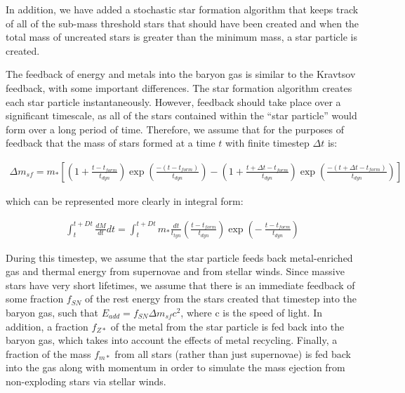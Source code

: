 In addition, we have added a stochastic star formation algorithm that keeps 
track of all of the sub-mass threshold stars that should have been created 
and when the total mass of uncreated stars is greater than the minimum mass, 
a star particle is created.

The feedback of energy and metals into the baryon gas is similar to
the Kravtsov feedback, with some important differences.  The star formation 
algorithm creates each star particle instantaneously.  However, feedback
should take place over a significant timescale, as all of the stars contained
within the ``star particle'' would form over a long period of time.  Therefore,
we assume that for the purposes of feedback that the mass of stars formed
at a time $t$ with finite timestep $\Delta t$ is:

\begin{eqnarray}  
\Delta m_{sf} =  m_{*} \left[ \left(1 + \frac{t-t_{form}}{t_{dyn}}  \right)
		   \exp{\left( \frac{-(t-t_{form})}{t_{dyn}} \right) }
	       - \left( 1 + \frac{t+ \Delta t-t_{form}}{t_{dyn}} \right) 
                    \exp{ \left( \frac{-(t+\Delta t-t_{form})}{t_{dyn}} \right)  }
                   \right]
\end{eqnarray}

which can be represented more clearly in integral form:

\begin{eqnarray}
\int_{t}^{t+Dt} \frac{dM}{dt} dt = \int_{t}^{t+Dt} m_{*} 
\frac{dt}{t_{tyn}} \left( \frac{t-t_{form}}{t_{dyn}} \right) 
\exp{ \left( - ~ \frac{t-t_{form}}{t_{dyn}} \right) }
\end{eqnarray}

During this timestep, we assume that the star particle feeds back
metal-enriched gas and thermal energy from supernovae and from stellar winds.
Since massive stars have very short lifetimes, we assume that there is an
immediate feedback of some fraction $f_{SN}$ of the rest energy from the
stars created that timestep into the baryon gas, such that 
$E_{add} = f_{SN} \Delta m_{sf} c^2$, where c is the speed of light.
In addition, a fraction $f_{Z*}$ of the metal from the star particle
is fed back into the baryon gas, which takes into account the effects
of metal recycling.  Finally, a fraction of the mass $f_{m*}$ from all
stars (rather than just supernovae) is fed back into the gas along with
momentum in order to simulate the mass ejection from non-exploding stars
via stellar winds.

